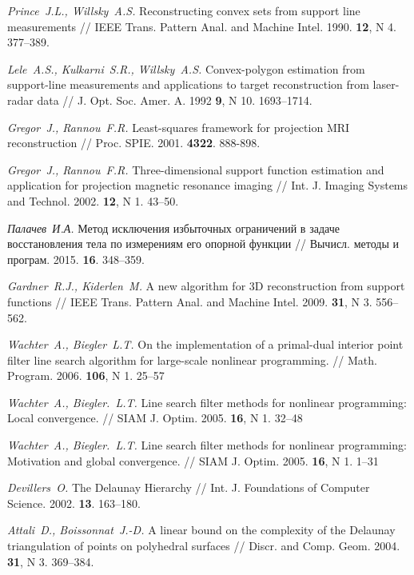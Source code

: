 \documentclass[a4paper, 11pt]{article}
\theoremstyle{MyDefinitionStyle}
\theoremstyle{MyTheoremStyle}
\begin{document}
\small
\begin{thebibliography}{50}

\emph{Prince~J.L., Willsky~A.S.}
Reconstructing convex sets from support line measurements //
IEEE Trans. Pattern Anal. and Machine Intel.
1990.
\textbf{12},
N 4.
377--389.

\emph{Lele~A.S., Kulkarni~S.R., Willsky~A.S.}
Convex-polygon estimation from support-line measurements and applications to
target reconstruction from laser-radar data //
J. Opt. Soc. Amer. A.
1992
\textbf{9},
N 10.
1693--1714.

\emph{Gregor~J., Rannou~F.R.}
Least-squares framework for projection {MRI} reconstruction //
Proc. SPIE.
2001.
\textbf{4322}.
888-898.

\emph{Gregor~J., Rannou~F.R.}
Three-dimensional support function estimation and application for projection
magnetic resonance imaging //
Int. J. Imaging Systems and Technol.
2002.
\textbf{12},
N 1.
43--50.

\emph{Палачев~И.А.}
Метод исключения избыточных ограничений в задаче восстановления тела по
измерениям его опорной функции //
Вычисл. методы и програм.
2015.
\textbf{16}.
348--359.

\emph{Gardner~R.J., Kiderlen~M.}
A new algorithm for 3D reconstruction from support functions //
IEEE Trans. Pattern Anal. and Machine Intel.
2009.
\textbf{31},
N 3.
556--562.

\emph{Wachter~A., Biegler~L.T.}
On the implementation of a primal-dual interior point filter line search
algorithm for large-scale nonlinear programming. //
Math. Program.
2006.
\textbf{106},
N 1.
25--57

\emph{Wachter~A., Biegler.~L.T.}
Line search filter methods for nonlinear programming: Local convergence. //
SIAM J. Optim.
2005.
\textbf{16},
N 1.
32--48

\emph{Wachter~A., Biegler.~L.T.}
Line search filter methods for nonlinear programming: Motivation and global
convergence. //
SIAM J. Optim.
2005.
\textbf{16},
N 1.
1--31

\emph{Devillers~O.}
The Delaunay Hierarchy //
Int. J. Foundations of Computer Science.
2002.
\textbf{13}.
163--180.

\emph{Attali~D., Boissonnat~J.-D.}
A linear bound on the complexity of the Delaunay triangulation of points on
polyhedral surfaces //
Discr. and Comp. Geom.
2004.
\textbf{31},
N 3.
369--384.

\end{thebibliography}
\end{document}
